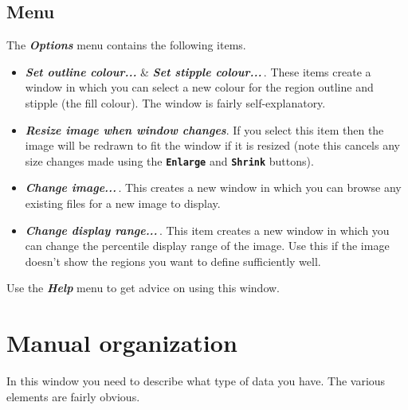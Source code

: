 \documentclass[11pt]{article}
\newcommand{\xlabel}[1]{}
\newcommand{\butt}[1]{{\bf \tt #1}}
\newcommand{\menu}[1]{{\bf \em #1}}
\begin{document}
\subsection{Menu \xlabel{CCDGeometryMenu}}
The \menu{Options} menu contains the following items.
\begin{itemize}
\item \menu{Set outline colour...} \& \menu{Set stipple colour...}\,.
These items create a window in which you can select a new colour for
the region outline and stipple (the fill colour). The window is fairly
self-explanatory.
\item \menu{Resize image when window changes}.
If you select this item then the image will be redrawn to fit the window
if it is resized (note this cancels any size changes made using the
\butt{Enlarge} and \butt{Shrink} buttons).
\item \menu{Change image...}\,.
This creates a new window in which you can browse any existing files
for a new image to display.
\item \menu{Change display range...}\,.
This item creates a new window in which you can change the percentile
display range of the image. Use this if the image doesn't show the
regions you want to define sufficiently well.
\end{itemize}

Use the \menu{Help} menu to get advice on using this window.

\section{Manual organization \xlabel{CCDNDFOrganizeWindow}
         \label{CCDNDFOrganizeWindow}}

In this window you need to describe what type of data you have. The
various elements are fairly obvious.
\end{document}

